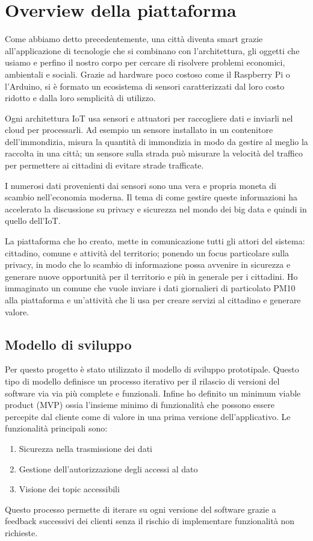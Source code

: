 \chapter{Overview della piattaforma \label{chap:two}}

Come abbiamo detto precedentemente, una città diventa smart grazie all'applicazione di tecnologie che si combinano con l'architettura, gli oggetti che usiamo e perfino il nostro corpo per cercare di risolvere problemi economici, ambientali e sociali. Grazie ad hardware poco costoso come il Raspberry Pi o l'Arduino, si è formato un ecosistema di sensori caratterizzati dal loro costo ridotto e dalla loro semplicità di utilizzo.

Ogni architettura IoT usa sensori e attuatori per raccogliere dati e inviarli nel cloud per processarli. Ad esempio un sensore installato in un contenitore dell'immondizia, misura la quantità di immondizia in modo da gestire al meglio la raccolta in una città; un sensore sulla strada può misurare la velocità del traffico per permettere ai cittadini di evitare strade trafficate.

I numerosi dati provenienti dai sensori sono una vera e propria moneta di scambio nell'economia moderna. Il tema di come gestire queste informazioni ha accelerato la discussione su privacy e sicurezza nel mondo dei big data e quindi in quello dell'IoT.

La piattaforma che ho creato, mette in comunicazione tutti gli attori del sistema: cittadino, comune e attività del territorio; ponendo un focus particolare sulla privacy, in modo che lo scambio di informazione possa avvenire in sicurezza e generare nuove opportunità per il territorio e più in generale per i cittadini.
Ho immaginato un comune che vuole inviare i dati giornalieri di particolato PM10 alla piattaforma e un'attività che li usa per creare servizi al cittadino e generare valore.

\section{Modello di sviluppo}
Per questo progetto è stato utilizzato il modello di sviluppo prototipale. Questo tipo di modello definisce un processo iterativo per il rilascio di versioni del software via via più complete e funzionali. 
Infine ho definito un minimum viable product (MVP) ossia l'insieme minimo di funzionalità che possono essere percepite dal cliente come di valore in una prima versione dell'applicativo.
Le funzionalità principali sono:
\begin{enumerate}
  \item Sicurezza nella trasmissione dei dati
  \item Gestione dell'autorizzazione degli accessi al dato
  \item Visione dei topic accessibili
\end{enumerate}
Questo processo permette di iterare su ogni versione del software grazie a feedback successivi dei clienti senza il rischio di implementare funzionalità non richieste. 

